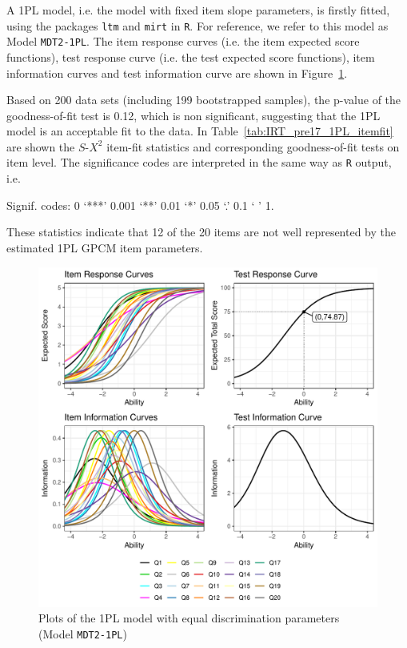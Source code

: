 \documentclass[a4paper]{report}
\begin{document}
A 1PL model, i.e. the model with fixed item slope parameters, is firstly fitted, using the packages \texttt{ltm} \cite{ltm} and \texttt{mirt} \cite{mirt} in \texttt{R}. For reference, we refer to this model as Model \texttt{MDT2-1PL}. The item response curves (i.e. the item expected score functions), test response curve (i.e. the test expected score functions), item information curves and test information curve are shown in Figure~\ref{fig:IRT_pre17_1PL}. 

Based on 200 data sets (including 199 bootstrapped samples), the p-value of the goodness-of-fit test is 0.12, which is non significant, suggesting that the 1PL model is an acceptable fit to the data. In Table~\ref{tab:IRT_pre17_1PL_itemfit} are shown the $S\text{-}X^2$ item-fit statistics and corresponding goodness-of-fit tests on item level. The significance codes are interpreted in the same way as \texttt{R} output, i.e. 

\begin{center}
Signif. codes: 0 ‘***’ 0.001 ‘**’ 0.01 ‘*’ 0.05 ‘.’ 0.1 ‘ ’ 1. 
\end{center}

\noindent
These statistics indicate that 12 of the 20 items are not well represented by the estimated 1PL GPCM item parameters. 

\begin{figure}[H]
  \centering
  \includegraphics[width=\linewidth]{fig/IRT_pre17_1PL.pdf}
  \caption{\label{fig:IRT_pre17_1PL}Plots of the 1PL model with equal discrimination parameters (Model \texttt{MDT2-1PL})}
\end{figure}
\end{document}

